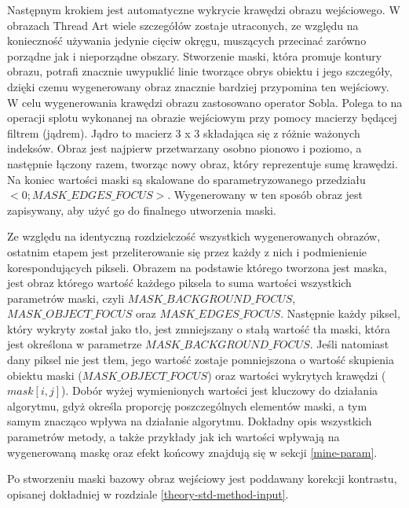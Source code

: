 \documentclass[a4paper, 12pt, polish, twoside]{extreport}
\begin{document}
    Następnym krokiem jest automatyczne wykrycie krawędzi obrazu wejściowego. W obrazach Thread Art wiele szczegółów zostaje utraconych, ze względu na konieczność używania jedynie cięciw okręgu, muszących przecinać zarówno porządne jak i nieporządne obszary. Stworzenie maski, która promuje kontury obrazu, potrafi znacznie uwypuklić linie tworzące obrys obiektu i jego szczegóły, dzięki czemu wygenerowany obraz znacznie bardziej przypomina ten wejściowy. W celu wygenerowania krawędzi obrazu zastosowano operator Sobla. Polega to na operacji splotu wykonanej na obrazie wejściowym przy pomocy macierzy będącej filtrem (jądrem). Jądro to macierz 3 x 3 składająca się z różnie ważonych indeksów. Obraz jest najpierw przetwarzany osobno pionowo i poziomo, a następnie łączony razem, tworząc nowy obraz, który reprezentuje sumę krawędzi. Na koniec wartości maski są skalowane do sparametryzowanego przedziału \(<0;MASK\_EDGES\_FOCUS>\). Wygenerowany w ten sposób obraz jest zapisywany, aby użyć go do finalnego utworzenia maski.
    
    Ze względu na identyczną rozdzielczość wszystkich wygenerowanych obrazów, ostatnim etapem jest przeliterowanie się przez każdy z nich i podmienienie korespondujących pikseli. Obrazem na podstawie którego tworzona jest maska, jest obraz którego wartość każdego piksela to suma wartości wszystkich parametrów maski, czyli \(MASK\_BACKGROUND\_FOCUS\), \(MASK\_OBJECT\_FOCUS\) oraz \(MASK\_EDGES\_FOCUS\). Następnie każdy piksel, który wykryty został jako tło, jest zmniejszany o stałą wartość tła maski, która jest określona w parametrze \(MASK\_BACKGROUND\_FOCUS\). Jeśli natomiast dany piksel nie jest tłem, jego wartość zostaje pomniejszona o wartość skupienia obiektu maski (\(MASK\_OBJECT\_FOCUS\)) oraz wartości wykrytych krawędzi (\(mask[i, j]\)). Dobór wyżej wymienionych wartości jest kluczowy do działania algorytmu, gdyż określa proporcję poszczególnych elementów maski, a tym samym znacząco wpływa na działanie algorytmu. Dokładny opis wszystkich parametrów metody, a także przykłady jak ich wartości wpływają na wygenerowaną maskę oraz efekt końcowy znajdują się w sekcji \ref{mine-param}.
    
    Po stworzeniu maski bazowy obraz wejściowy jest poddawany korekcji kontrastu, opisanej dokładniej w rozdziale \ref{theory-std-method-input}.
    
\end{document}
